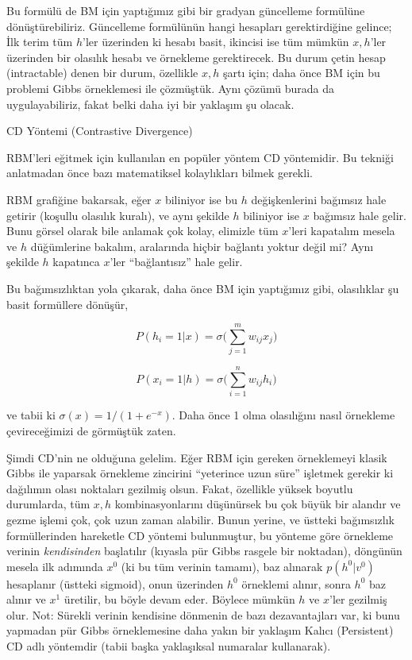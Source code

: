 \documentclass[12pt,fleqn]{article}\usepackage{../../common}
\begin{document}
Bu formülü de BM için yaptığımız gibi bir gradyan güncelleme formülüne
dönüştürebiliriz. Güncelleme formülünün hangi hesapları gerektirdiğine
gelince; İlk terim tüm $h$'ler üzerinden ki hesabı basit, ikincisi ise tüm
mümkün $x,h$'ler üzerinden bir olasılık hesabı ve örnekleme
gerektirecek. Bu durum çetin hesap (intractable) denen bir durum, özellikle
$x,h$ şartı için; daha önce BM için bu problemi Gibbs örneklemesi ile
çözmüştük. Aynı çözümü burada da uygulayabiliriz, fakat belki daha iyi bir
yaklaşım şu olacak.

CD Yöntemi (Contrastive Divergence) 

RBM'leri eğitmek için kullanılan en popüler yöntem CD yöntemidir. Bu
tekniği anlatmadan önce bazı matematiksel kolaylıkları bilmek gerekli.

RBM grafiğine bakarsak, eğer $x$ biliniyor ise bu $h$ değişkenlerini
bağımsız hale getirir (koşullu olasılık kuralı), ve aynı şekilde $h$
biliniyor ise $x$ bağımsız hale gelir. Bunu görsel olarak bile anlamak çok
kolay, elimizle tüm $x$'leri kapatalım mesela ve $h$ düğümlerine bakalım,
aralarında hiçbir bağlantı yoktur değil mi? Aynı şekilde $h$ kapatınca
$x$'ler ``bağlantısız'' hale gelir. 

Bu bağımsızlıktan yola çıkarak, daha önce BM için yaptığımız gibi,
olasılıklar şu basit formüllere dönüşür,

$$ P(h_i=1|x) = \sigma \bigg( \sum_{j=1}^{m} w_{ij} x_j \bigg) $$

$$ P(x_i=1|h) = \sigma \bigg( \sum_{i=1}^{n} w_{ij} h_i \bigg) $$

ve tabii ki $\sigma(x) = 1 / (1+e^{-x})$. Daha önce 1 olma olasılığını
nasıl örnekleme çevireceğimizi de görmüştük zaten. 

Şimdi CD'nin ne olduğuna gelelim. Eğer RBM için gereken örneklemeyi klasik
Gibbs ile yaparsak örnekleme zincirini ``yeterince uzun süre'' işletmek
gerekir ki dağılımın olası noktaları gezilmiş olsun. Fakat, özellikle
yüksek boyutlu durumlarda, tüm $x,h$ kombinasyonlarını düşünürsek bu çok
büyük bir alandır ve gezme işlemi çok, çok uzun zaman alabilir. Bunun
yerine, ve üstteki bağımsızlık formüllerinden hareketle CD yöntemi
bulunmuştur, bu yönteme göre örnekleme verinin {\em kendisinden} başlatılır
(kıyasla pür Gibbs rasgele bir noktadan), döngünün mesela ilk adımında
$x^0$ (ki bu tüm verinin tamamı), baz alınarak $p(h^0|v^0)$ hesaplanır
(üstteki sigmoid), onun üzerinden $h^0$ örneklemi alınır, sonra $h^0$ baz
alınır ve $x^1$ üretilir, bu böyle devam eder. Böylece mümkün $h$ ve
$x$'ler gezilmiş olur. Not: Sürekli verinin kendisine dönmenin de bazı
dezavantajları var, ki bunu yapmadan pür Gibbs örneklemesine daha yakın bir
yaklaşım Kalıcı (Persistent) CD adlı yöntemdir (tabii başka yaklaşıksal
numaralar kullanarak).
\end{document}
